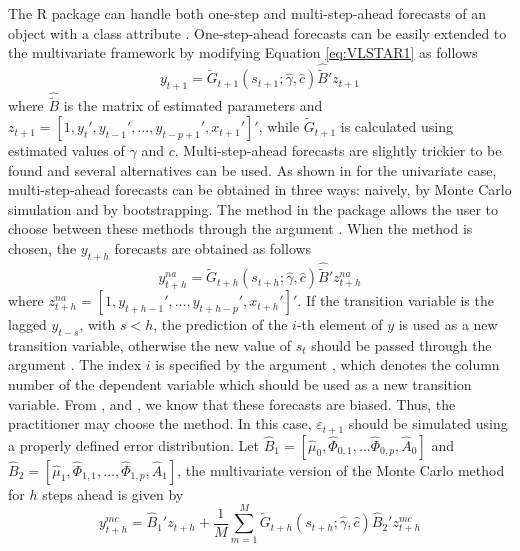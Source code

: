 The R package  can handle both one-step and multi-step-ahead forecasts of an object with a class attribute . One-step-ahead forecasts can be easily extended to the multivariate framework by modifying Equation \eqref{eq:VLSTAR1} as follows
\begin{equation*}
	y_{t+1} = \tilde{G}_{t+1}\left(s_{t+1}; \hat{\gamma}, \hat{c}\right) \hat{\tilde{B}}' z_{t+1}
\end{equation*}
where $\hat{\tilde{B}}$ is the matrix of estimated parameters and $z_{t+1} = \left[1, y_{t}', y_{t-1}', \ldots, y_{t-p+1}', x_{t+1}'\right]'$, while $\tilde{G}_{t+1}$ is calculated using estimated values of $\gamma$ and $c$. Multi-step-ahead forecasts are slightly trickier to be found and several alternatives can be used. As shown in \citet*{lute07} for the univariate case, multi-step-ahead forecasts can be obtained in three ways: naively, by Monte Carlo simulation and by bootstrapping. The method  in the  package allows the user to choose between these methods through the argument . When the  method is chosen, the $y_{t+h}$ forecasts are obtained as follows
\begin{equation*}
	y_{t+h}^{na} = \tilde{G}_{t+h}\left(s_{t+h}; \hat{\gamma}, \hat{c}\right) \hat{\tilde{B}}' z_{t+h}^{na}
\end{equation*}
where $z_{t+h}^{na} = \left[1, y_{t+h-1}', \ldots, y_{t+h-p}', x_{t+h}'\right]'$. If the transition variable is the lagged $y_{t-s}$, with $s < h$, the prediction of the $i$-th element of $y$ is used as a new transition variable, otherwise the new value of $s_t$ should be passed through the argument . The index $i$ is specified by the argument , which denotes the column number of the dependent variable which should be used as a new transition variable. From \citet{hute13}, \citet{kote11} and \citet{tetjg10}, we know that these forecasts are biased. Thus, the practitioner may choose the  method. In this case, $\varepsilon_{t+1}$ should be simulated using a properly defined error distribution. Let $\hat{B}_1 = \left[\hat{\mu}_0, \hat{\Phi}_{0,1}, \ldots \hat{\Phi}_{0,p}, \hat{A}_0\right]$ and $\hat{B}_2 = \left[\hat{\mu}_1, \hat{\Phi}_{1,1}, \ldots, \hat{\Phi}_{1,p}, \hat{A}_1\right]$, the multivariate version of the Monte Carlo method for $h$ steps ahead is given by
\begin{equation*}
	y_{t+h}^{mc} = \hat{B}_1'z_{t+h} + \frac{1}{M}\sum_{m=1}^{M} \tilde{G}_{t+h}\left(s_{t+h}; \hat{\gamma}, 
	\hat{c}\right)\hat{B}_2'z_{t+h}^{mc}
\end{equation*}
